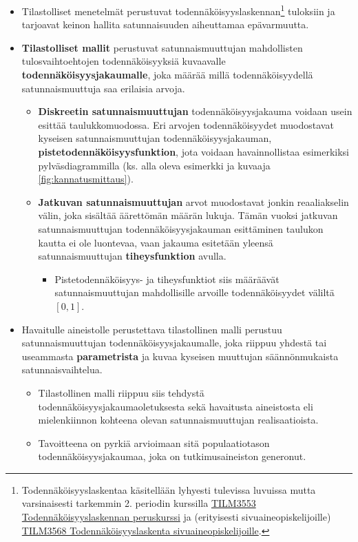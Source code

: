 \documentclass[
]{book}
\providecommand{\tightlist}{%
  \setlength{\itemsep}{0pt}\setlength{\parskip}{0pt}}
\begin{document}
\begin{itemize}
\tightlist
\item
  Tilastolliset menetelmät perustuvat todennäköisyyslaskennan\footnote{Todennäköisyyslaskentaa käsitellään lyhyesti tulevissa luvuissa mutta varsinaisesti tarkemmin 2. periodin kurssilla \href{https://opas.peppi.utu.fi/fi/opintojakso/TILM3553/1734?period=2022-2024}{TILM3553 Todennäköisyyslaskennan peruskurssi} ja (erityisesti sivuaineopiskelijoille) \href{https://opas.peppi.utu.fi/fi/opintojakso/TILM3568/3385?period=2022-2024}{TILM3568 Todennäköisyyslaskenta sivuaineopiskelijoille}.} tuloksiin ja tarjoavat keinon hallita satunnaisuuden aiheuttamaa epävarmuutta.
\item
  \textbf{Tilastolliset mallit} perustuvat satunnaismuuttujan mahdollisten tulosvaihtoehtojen todennäköisyyksiä kuvaavalle \textbf{todennäköisyysjakaumalle}, joka määrää millä todennäköisyydellä satunnaismuuttuja saa erilaisia arvoja.

  \begin{itemize}
  \tightlist
  \item
    \textbf{Diskreetin satunnaismuuttujan} todennäköisyysjakauma voidaan usein esittää taulukkomuodossa. Eri arvojen todennäköisyydet muodostavat kyseisen satunnaismuuttujan todennäköisyysjakauman, \textbf{pistetodennäköisyysfunktion}, jota voidaan havainnollistaa esimerkiksi pylväsdiagrammilla (ks. alla oleva esimerkki ja kuvaaja \ref{fig:kannatusmittaus}).
  \item
    \textbf{Jatkuvan satunnaismuuttujan} arvot muodostavat jonkin reaaliakselin välin, joka sisältää äärettömän määrän lukuja. Tämän vuoksi jatkuvan satunnaismuuttujan todennäköisyysjakauman esittäminen taulukon kautta ei ole luontevaa, vaan jakauma esitetään yleensä satunnaismuuttujan \textbf{tiheysfunktion} avulla.

    \begin{itemize}
    \tightlist
    \item
      Pistetodennäköisyys- ja tiheysfunktiot siis määräävät satunnaismuuttujan mahdollisille arvoille todennäköisyydet väliltä \([0,1]\).
    \end{itemize}
  \end{itemize}
\item
  Havaitulle aineistolle perustettava tilastollinen malli perustuu satunnaismuuttujan todennäköisyysjakaumalle, joka riippuu yhdestä tai useammasta \textbf{parametrista} ja kuvaa kyseisen muuttujan säännönmukaista satunnaisvaihtelua.

  \begin{itemize}
  \tightlist
  \item
    Tilastollinen malli riippuu siis tehdystä todennäköisyysjakaumaoletuksesta sekä havaitusta aineistosta eli mielenkiinnon kohteena olevan satunnaismuuttujan realisaatioista.
  \item
    Tavoitteena on pyrkiä arvioimaan sitä populaatiotason todennäköisyysjakaumaa, joka on tutkimusaineiston generonut.


\end{itemize}
\end{itemize}
\end{document}
